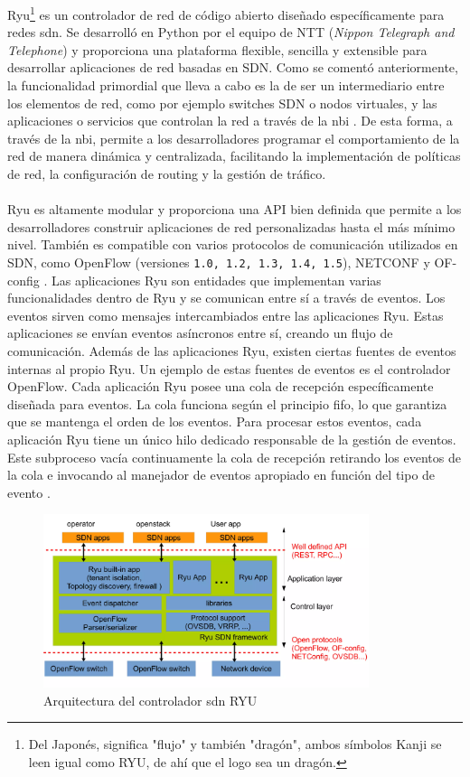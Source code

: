 Ryu\footnote{Del Japonés, significa "flujo" y también "dragón", ambos símbolos Kanji se leen igual como RYU, de ahí que el logo sea un dragón.} es un controlador de red de código abierto diseñado específicamente para redes \gls{sdn}. Se desarrolló en Python por el equipo de NTT (\textit{Nippon Telegraph and Telephone}) y proporciona una plataforma flexible, sencilla y extensible para desarrollar aplicaciones de red basadas en SDN. Como se comentó anteriormente, la funcionalidad primordial que lleva a cabo es la de ser un intermediario entre los elementos de red, como por ejemplo switches SDN o nodos virtuales, y las aplicaciones o servicios que controlan la red a través de la \gls{nbi} \cite{tomonori2013introduction}. De esta forma, a través de la \gls{nbi}, permite a los desarrolladores programar el comportamiento de la red de manera dinámica y centralizada, facilitando la implementación de políticas de red, la configuración de routing y la gestión de tráfico.\\
\\
Ryu es altamente modular y proporciona una API bien definida que permite a los desarrolladores construir aplicaciones de red personalizadas hasta el más mínimo nivel. También es compatible con varios protocolos de comunicación utilizados en SDN, como OpenFlow (versiones \texttt{1.0, 1.2, 1.3, 1.4, 1.5}), NETCONF y OF-config \cite{tomonori2013introduction}.  Las aplicaciones Ryu son entidades que implementan varias funcionalidades dentro de Ryu y se comunican entre sí a través de eventos. Los eventos sirven como mensajes intercambiados entre las aplicaciones Ryu. Estas aplicaciones se envían eventos asíncronos entre sí, creando un flujo de comunicación. Además de las aplicaciones Ryu, existen ciertas fuentes de eventos internas al propio Ryu. Un ejemplo de estas fuentes de eventos es el controlador OpenFlow. Cada aplicación Ryu posee una cola de recepción específicamente diseñada para eventos. La cola funciona según el principio \gls{fifo}, lo que garantiza que se mantenga el orden de los eventos. Para procesar estos eventos, cada aplicación Ryu tiene un único hilo dedicado responsable de la gestión de eventos. Este subproceso vacía continuamente la cola de recepción retirando los eventos de la cola e invocando al manejador de eventos apropiado en función del tipo de evento \cite{ryu1}.

\begin{figure}[ht]
    \centering
    \includegraphics[width=0.85\textwidth]{archivos/img/teoria/ryu.png}
    \caption{Arquitectura del controlador \gls{sdn} RYU \cite{ryu2}}
    \label{fig:ryu}
\end{figure}


